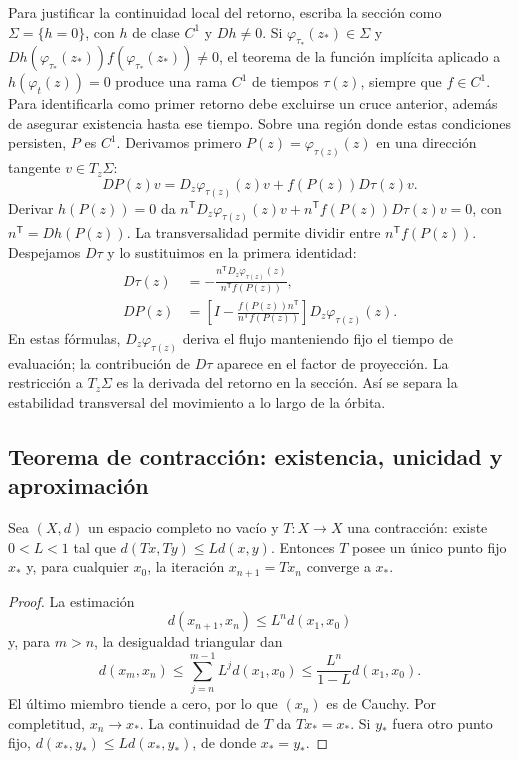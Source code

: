 Para justificar la continuidad local del retorno, escriba la sección como
$\Sigma=\{h=0\}$, con $h$ de clase $C^1$ y $Dh\ne0$.
Si $\varphi_{\tau_*}(z_*)\in\Sigma$ y
$Dh(\varphi_{\tau_*}(z_*))f(\varphi_{\tau_*}(z_*))\ne0$, el teorema
de la función implícita aplicado a
$h(\varphi_t(z))=0$ produce una rama $C^1$ de tiempos $\tau(z)$,
siempre que $f\in C^1$. Para identificarla como primer retorno debe
excluirse un cruce anterior, además de asegurar existencia hasta ese tiempo.
Sobre una región donde estas condiciones persisten, $P$ es $C^1$.
Derivamos primero \(P(z)=\varphi_{\tau(z)}(z)\) en una dirección
tangente \(v\in T_z\Sigma\):
\[
 DP(z)v=D_z\varphi_{\tau(z)}(z)v+f(P(z))D\tau(z)v.
\]
Derivar \(h(P(z))=0\) da
\(n^{\mathsf T}D_z\varphi_{\tau(z)}(z)v+
n^{\mathsf T}f(P(z))D\tau(z)v=0\), con
\(n^{\mathsf T}=Dh(P(z))\). La transversalidad permite dividir entre
\(n^{\mathsf T}f(P(z))\). Despejamos \(D\tau\) y lo sustituimos en
la primera identidad:
\begin{align}
 D\tau(z)&=-\frac{n^{\mathsf T}D_z\varphi_{\tau(z)}(z)}
                   {n^{\mathsf T}f(P(z))},\nonumber\\
 DP(z)&=\left[I-\frac{f(P(z))n^{\mathsf T}}
                        {n^{\mathsf T}f(P(z))}\right]
                        D_z\varphi_{\tau(z)}(z).
 \label{eq:guide-return-derivative}
\end{align}
En estas fórmulas, $D_z\varphi_{\tau(z)}$ deriva el flujo manteniendo
fijo el tiempo de evaluación; la contribución de $D\tau$ aparece en
el factor de proyección. La restricción a $T_z\Sigma$ es la derivada
del retorno en la sección. Así se separa la estabilidad transversal
del movimiento a lo largo de la órbita.

\subsection{Teorema de contracción: existencia, unicidad y aproximación}

\begin{proposition}
Sea $(X,d)$ un espacio completo no vacío y $T:X\to X$ una contracción: existe $0<L<1$ tal que
$d(Tx,Ty)\leq Ld(x,y)$. Entonces $T$ posee un único punto fijo $x_*$ y, para
cualquier $x_0$, la iteración $x_{n+1}=Tx_n$ converge a $x_*$.
\end{proposition}

\begin{proof}
La estimación
\[
 d(x_{n+1},x_n)\leq L^n d(x_1,x_0)
\]
y, para \(m>n\), la desigualdad triangular dan
\[
 d(x_m,x_n)\le\sum_{j=n}^{m-1}L^j d(x_1,x_0)
 \le\frac{L^n}{1-L}d(x_1,x_0).
\]
El último miembro tiende a cero, por lo que $(x_n)$ es de Cauchy. Por
completitud, $x_n\to x_*$. La continuidad de $T$ da $Tx_*=x_*$. Si $y_*$ fuera
otro punto fijo,
$d(x_*,y_*)\leq Ld(x_*,y_*)$, de donde $x_*=y_*$.
\end{proof}

